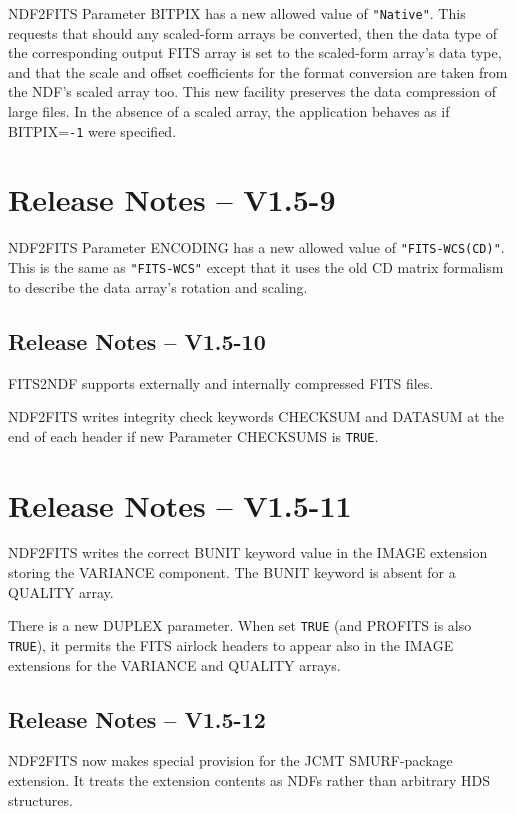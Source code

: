\documentclass[twoside,11pt]{article}
\newcommand{\htmlref}[2]{#1}
\begin{document}
\htmlref{NDF2FITS}{NDF2FITS} Parameter BITPIX has a new allowed value
of \texttt{"Native"}.  This requests that should any scaled-form arrays be 
converted, then the data type of the corresponding output FITS array 
is set to the scaled-form array's data type, and that the scale and
offset coefficients for the format conversion are taken from the NDF's
scaled array too.  This new facility preserves the data compression
of large files.  In the absence of a scaled array, the application
behaves as if BITPIX=\texttt{-1} were specified.

\section{Release Notes -- V1.5-9}

\htmlref{NDF2FITS}{NDF2FITS} Parameter ENCODING has a new allowed
value of \texttt{"FITS-WCS(CD)"}.  This is the same as
\texttt{"FITS-WCS"} except that it uses the old CD matrix formalism 
to describe the data array's rotation and scaling.

\subsection{Release Notes -- V1.5-10}

\htmlref{FITS2NDF}{FITS2NDF} supports externally and internally compressed
FITS files.

\htmlref{NDF2FITS}{NDF2FITS} writes integrity check keywords CHECKSUM
and DATASUM at the end of each header if new Parameter CHECKSUMS is 
\texttt{TRUE}.

\section{Release Notes -- V1.5-11}

\htmlref{NDF2FITS}{NDF2FITS} writes the correct BUNIT keyword value in 
the IMAGE extension storing the VARIANCE component.  The BUNIT
keyword is absent for a QUALITY array.

There is a new DUPLEX parameter.  When set \texttt{TRUE} (and PROFITS
is also \texttt{TRUE}), it permits the FITS airlock headers to appear
also in the IMAGE extensions for the VARIANCE and QUALITY arrays.

\subsection{Release Notes -- V1.5-12}

\htmlref{NDF2FITS}{NDF2FITS} now makes special provision for the JCMT
SMURF-package extension.  It treats the extension contents as NDFs
rather than arbitrary HDS structures.
\end{document}
